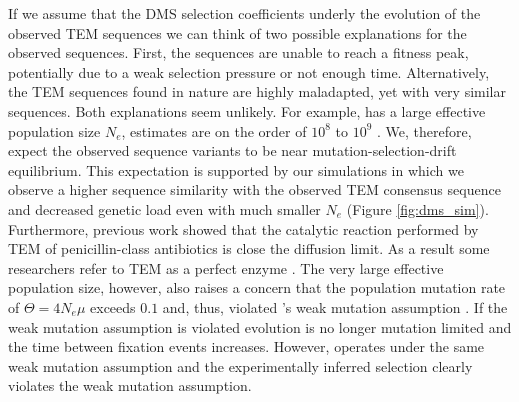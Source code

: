 
If we assume that the DMS selection coefficients underly the evolution of the observed TEM sequences we can think of two possible explanations for the observed sequences.
First, the sequences are unable to reach a fitness peak, potentially due to a weak selection pressure or not enough time.
Alternatively, the TEM sequences found in nature are highly maladapted, yet with very similar sequences.
Both explanations seem unlikely.
For example, \ecoli has a large effective population size $N_e$, estimates are on the order of $10^8$ to $10^9$ \citep{OchmanAndWilson1987, hartl1994}.
We, therefore, expect the observed sequence variants to be near mutation-selection-drift equilibrium.
This expectation is supported by our simulations in which we observe a higher sequence similarity with the observed TEM consensus sequence and decreased genetic load even with much smaller $N_e$ (Figure \ref{fig:dms_sim}).
Furthermore, previous work showed that the catalytic reaction performed by TEM of penicillin-class antibiotics is close the diffusion limit.
As a result some researchers refer to TEM as a perfect enzyme \citep{matagne1998,stiffler2016}.
The very large effective population size, however, also raises a concern that the population mutation rate of \ecoli $\Theta = 4N_e\mu$ exceeds $0.1$ and, thus, violated \selac's weak mutation assumption \citep{deKoning259507}.
If the weak mutation assumption is violated evolution is no longer mutation limited and the time between fixation events increases.
However, \phydms operates under the same weak mutation assumption and the experimentally inferred selection clearly violates the weak mutation assumption.

